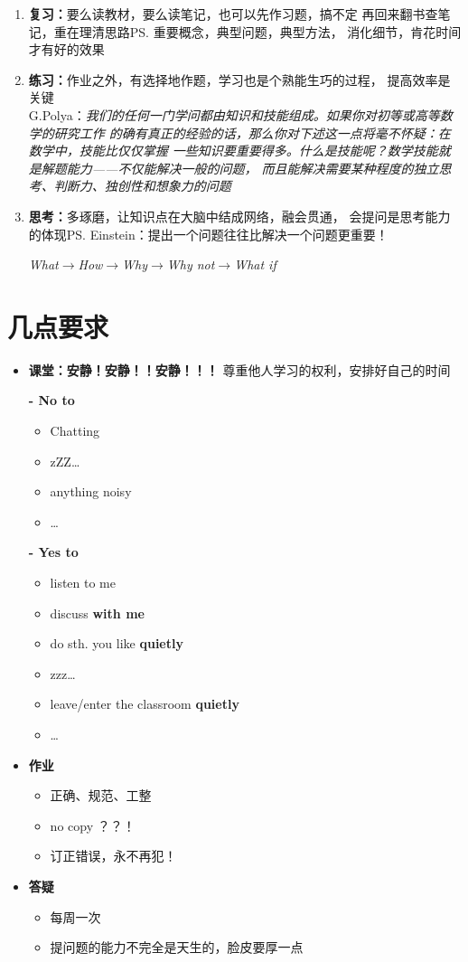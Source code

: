 \begin{itemize}
\begin{enumerate}
	  简要记笔记\ps{推荐：\b 康奈尔笔记法}，重点记思路和书本上没有的内容
	  \item {\bf 复习：}要么读教材，要么读笔记，也可以先作习题，搞不定
	  再回来翻书查笔记，重在理清思路\ps{重要概念，典型问题，典型方法}，
	  消化细节，肯花时间才有好的效果
	  \item {\bf 练习：}作业之外，有选择地作题，学习也是个熟能生巧的过程，
	  提高效率是关键\\
	  G.Polya：{\it 我们的任何一门学问都由知识和技能组成。如果你对初等或高等数学的研究工作
	  的确有真正的经验的话，那么你对下述这一点将毫不怀疑：在数学中，技能比仅仅掌握
	  一些知识要重要得多。什么是技能呢？数学技能就是解题能力——不仅能解决一般的问题，
	  而且能解决需要某种程度的独立思考、判断力、独创性和想象力的问题}
	  \item {\bf 思考：}多琢磨，让知识点在大脑中结成网络，融会贯通，
	  会提问是思考能力的体现\ps{Einstein：提出一个问题往往比解决一个问题更重要！}
	  \centerline{\it What$\to$How$\to$Why$\to$Why not$\to$What if}
	\end{enumerate}
\end{itemize}

\section{几点要求}
\begin{itemize}
	\item {\bf 课堂：安静！安静！！安静！！！}
	尊重他人学习的权利，安排好自己的时间
	
	{\bf - No to}
	  \begin{itemize}
	    \item Chatting
	    \item zZZ\ldots
	    \item anything noisy
	    \item \ldots
	  \end{itemize}
	{\bf - Yes to}
  \begin{itemize}
    \item listen to me
    \item discuss {\bf with me}
    \item do sth. you like {\bf quietly}
    \item zzz\ldots
    \item leave/enter the classroom {\bf quietly}
    \item \ldots
  \end{itemize}
  \item {\bf 作业}
  \begin{itemize}
    \item 正确、规范、工整
    \item no copy ？？！
    \item 订正错误，永不再犯！
  \end{itemize}
	\item {\bf 答疑}
	  \begin{itemize}
	    \item 每周一次
	    \item 提问题的能力不完全是天生的，脸皮要厚一点
	  \end{itemize}
\end{itemize}

